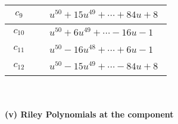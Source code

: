 \documentclass[1p]{elsarticle_modified}
\theoremstyle{definition}
\begin{document}
\begin{tabular}{m{50pt}|m{274pt}}
\hline $$\begin{aligned}c_{9}\end{aligned}$$&$\begin{aligned}
&u^{50}+15 u^{49}+\cdots+84 u+8
\end{aligned}$\\
\hline $$\begin{aligned}c_{10}\end{aligned}$$&$\begin{aligned}
&u^{50}+6 u^{49}+\cdots-16 u-1
\end{aligned}$\\
\hline $$\begin{aligned}c_{11}\end{aligned}$$&$\begin{aligned}
&u^{50}-16 u^{48}+\cdots+6 u-1
\end{aligned}$\\
\hline $$\begin{aligned}c_{12}\end{aligned}$$&$\begin{aligned}
&u^{50}-15 u^{49}+\cdots-84 u+8
\end{aligned}$\\
\hline
\end{tabular}\\~\\
\newpage\renewcommand{\arraystretch}{1}
\flushleft \textbf{(v) Riley Polynomials at the component}\newline \\
\end{document}
